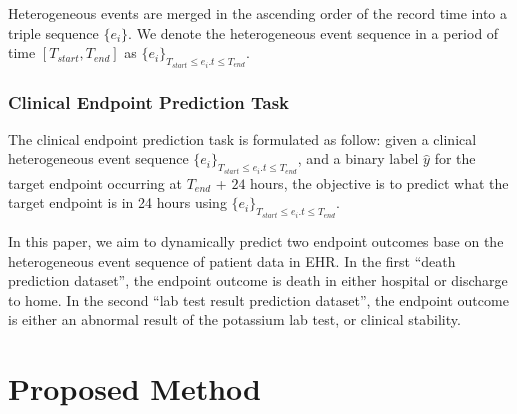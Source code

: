 \documentclass[letterpaper]{article} %
\begin{document}
Heterogeneous events are merged in the ascending order of the record time into a triple sequence $\{e_i\}$.
We denote the heterogeneous event sequence in a period of time $[T_{start},T_{end}]$ as $\{e_i\}_{T_{start}\leq e_i.t\leq T_{end}}$.

\subsubsection{Clinical Endpoint Prediction Task}

The clinical endpoint prediction task is formulated as follow: given a clinical heterogeneous event sequence $\{e_i\}_{T_{start}\leq e_i.t\leq T_{end}}$, and a binary label $\hat{y}$ for the target endpoint occurring at $ T_{end}$ + $24$ hours, the objective is to predict what the target endpoint is in 24 hours using $\{e_i\}_{T_{start}\leq e_i.t\leq T_{end}}$.

In this paper, we aim to dynamically predict two endpoint outcomes base on the heterogeneous event sequence of patient data in EHR. In the first ``death prediction dataset'', the endpoint outcome is death in either hospital or discharge to home. In the second ``lab test result prediction dataset'', the endpoint outcome is either an abnormal result of the potassium lab test, or clinical stability.




\section{Proposed Method}

\end{document}
